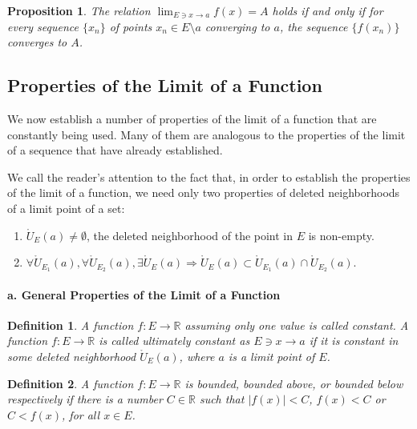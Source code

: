 \documentclass[a4paper,12pt]{article} %
\newtheorem{definition}{Definition}[section]
\newtheorem{proposition}{Proposition}[section]
\begin{document}
\begin{proposition}
    The relation $\displaystyle \lim_{E \ni x \to a} f(x) = A$ holds if and 
    only if for every sequence $\{x_n\}$ of points $x_n \in E \setminus a $ 
    converging to $a$, the sequence $\{f(x_n)\}$ converges to $A$.
\end{proposition}

\subsection{Properties of the Limit of a Function}
We now establish a number of properties of the limit of a function 
that are constantly being used. Many of them are analogous to the 
properties of the limit of a sequence that have already established.

We call the reader's attention to the fact that, in order to establish 
the properties of the limit of a function, we need only two properties 
of deleted neighborhoods of a limit point of a set:

\begin{enumerate}
    \item $\displaystyle \mathring{U}_E(a) \ne \emptyset$, the deleted neighborhood 
    of the point in $E$ is non-empty.
\item $\displaystyle \forall\mathring{U}_{E_1}(a), \forall\mathring{U}_{E_2}(a),
        \exists\mathring{U}_E(a) \Rightarrow \mathring{U}_E(a) \subset 
        \mathring{U}_{E_1}(a) \cap \mathring{U}_{E_2}(a).$
\end{enumerate}

\paragraph{{\rm \textbf{a. General Properties of the Limit of a Function}}}
\begin{definition}
    A function $f: E \to \mathbb{R}$ assuming only one value is called constant.
    A function $f: E \to \mathbb{R}$ is called ultimately constant as 
    $E \ni x \to a$ if it is constant in some deleted neighborhood $\displaystyle 
    \mathring{U}_E(a)$, where $a$ is a limit point of $E$.
\end{definition}

\begin{definition}
    A function $f: E \to \mathbb{R}$ is bounded, bounded above, or bounded 
    below respectively if there is a number $C \in \mathbb{R}$ such that 
    $\displaystyle \left|f(x)\right| < C$, $f(x) < C$ or $C < f(x)$, for all 
    $x \in E$.
\end{definition}
\end{document}
